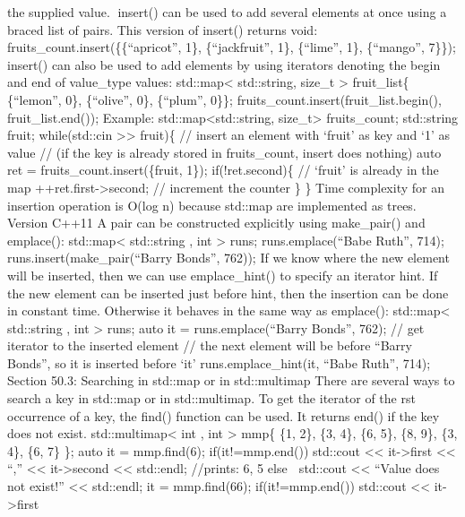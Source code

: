 the supplied value. insert() can be used to add several elements at
once using a braced list of pairs. This version of insert() returns
void: fruits\_count.insert(\{\{``apricot'', 1\}, \{``jackfruit'', 1\},
\{``lime'', 1\}, \{``mango'', 7\}\}); insert() can also be used to add
elements by using iterators denoting the begin and end of value\_type
values: std::map\textless{} std::string, size\_t \textgreater{}
fruit\_list\{ \{``lemon'', 0\}, \{``olive'', 0\}, \{``plum'', 0\}\};
fruits\_count.insert(fruit\_list.begin(), fruit\_list.end()); Example:
std::map\textless std::string, size\_t\textgreater{} fruits\_count;
std::string fruit; while(std::cin \textgreater\textgreater{} fruit)\{ //
insert an element with `fruit' as key and `1' as value // (if the key is
already stored in fruits\_count, insert does nothing) auto ret =
fruits\_count.insert(\{fruit, 1\}); if(!ret.second)\{ // `fruit' is
already in the map ++ret.first-\textgreater second; // increment the
counter \} \} Time complexity for an insertion operation is O(log n)
because std::map are implemented as trees. Version C++11 A pair can be
constructed explicitly using make\_pair() and emplace():
std::map\textless{} std::string , int \textgreater{} runs;
runs.emplace(``Babe Ruth'', 714); runs.insert(make\_pair(``Barry
Bonds'', 762)); If we know where the new element will be inserted, then
we can use emplace\_hint() to specify an iterator hint. If the new
element can be inserted just before hint, then the insertion can be done
in constant time. Otherwise it behaves in the same way as emplace():
std::map\textless{} std::string , int \textgreater{} runs; auto it =
runs.emplace(``Barry Bonds'', 762); // get iterator to the inserted
element // the next element will be before ``Barry Bonds'', so it is
inserted before `it' runs.emplace\_hint(it, ``Babe Ruth'', 714); Section
50.3: Searching in std::map or in std::multimap There are several ways
to search a key in std::map or in std::multimap. To get the iterator of
the rst occurrence of a key, the find() function can be used. It returns
end() if the key does not exist. std::multimap\textless{} int , int
\textgreater{} mmp\{ \{1, 2\}, \{3, 4\}, \{6, 5\}, \{8, 9\}, \{3, 4\},
\{6, 7\} \}; auto it = mmp.find(6); if(it!=mmp.end()) std::cout
\textless\textless{} it-\textgreater first \textless\textless{} ``,''
\textless\textless{} it-\textgreater second \textless\textless{}
std::endl; //prints: 6, 5 else  std::cout \textless\textless{} ``Value
does not exist!'' \textless\textless{} std::endl; it = mmp.find(66);
if(it!=mmp.end()) std::cout \textless\textless{} it-\textgreater first
